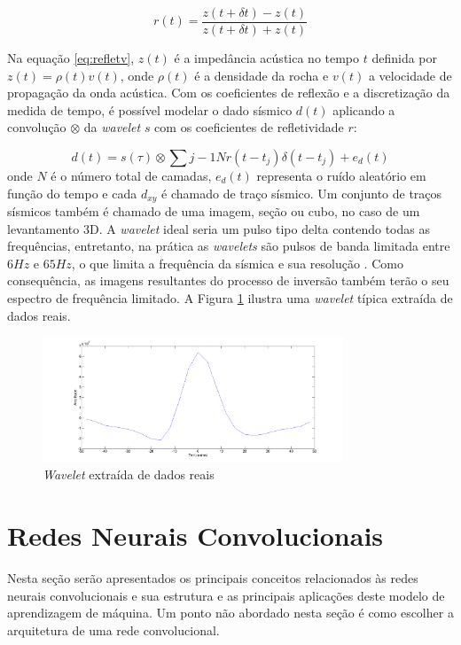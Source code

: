 \begin{equation}
r(t) = \frac{z(t+\delta t)-z(t)}{z(t+\delta t)+z(t)}
\label{eq:refletv}
\end{equation}

Na equação \ref{eq:refletv}, $z(t)$ é a impedância acústica no tempo $t$ definida por
$z(t)=\rho(t)v(t)$, onde $\rho(t)$ é a densidade da rocha e $v(t)$ a
velocidade de propagação da onda acústica. Com os coeficientes de
reflexão e a discretização da medida de tempo, é possível
modelar o dado sísmico $d(t)$ aplicando a convolução $\otimes$
da \textit{wavelet} $s$ com os coeficientes de refletividade $r$:

\begin{equation}
d(t) = s(\tau) \otimes \sum{j-1}{N} r(t- t_j) \delta(t - t_j) + e_d(t)
\end{equation}
onde $N$ é o número
total de camadas, $e_d(t)$ representa o ruído aleatório em função do tempo
e cada $d_{xy}$ é chamado de traço sísmico. Um conjunto de traços
sísmicos também é chamado de uma imagem, seção ou cubo, no caso de um
levantamento 3D. A \textit{wavelet} ideal seria um pulso tipo delta contendo
todas as frequências, entretanto, na prática as
\textit{wavelets} são pulsos de banda limitada entre $6Hz$ e $65Hz$, o que
limita a frequência da sísmica e sua resolução \citep[p. 11]{sen_livro}.
Como consequência, as imagens resultantes do processo de inversão também terão
o seu espectro de frequência limitado.
A Figura \ref{fig:wavelet} ilustra uma \textit{wavelet} típica extraída de dados
reais.

\begin{figure}[htp]
\begin{center}
  \includegraphics[width=0.8\textwidth]{fig/wavelet}
  \caption{\textit{Wavelet} extraída de dados reais}
  \label{fig:wavelet}
\end{center}
\end{figure}

\section{Redes Neurais Convolucionais}
Nesta seção serão apresentados os principais conceitos relacionados às redes
neurais convolucionais e sua estrutura e as principais
aplicações deste modelo de aprendizagem de máquina. Um ponto não abordado nesta seção é
como escolher a arquitetura de uma rede convolucional.

